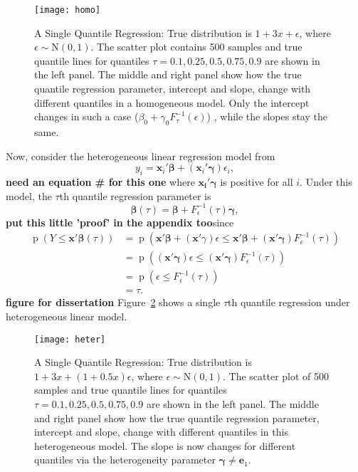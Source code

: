 \documentclass[12pt]{article}
\DeclareMathOperator{\pr}{p}
\begin{document}
\begin{figure}[h]
  \centerline{\texttt{[image: homo]}}
  \caption[]{\label{fig:homo} A Single Quantile Regression: True 
    distribution is $1+3x + \epsilon$, where $\epsilon \sim
    \mathrm{N}(0,1)$. The scatter plot contains 500 samples and true quantile
    lines for quantiles $\tau=0.1,0.25,0.5,0.75,0.9$ are shown in the
    left panel. The middle and right panel show how the true quantile
    regression parameter, intercept and slope, change with different
    quantiles in a homogeneous model. Only the intercept changes in such
    a case ($\beta_0+\gamma_0 F^{-1}_{\tau}(\epsilon)$) , while the slopes
    stay the same.}
  \label{fig:homo}
\end{figure}

Now, consider the heterogeneous linear regression model  from \citet{he1998}  
\begin{displaymath}
  y_i = \bm{x}_i'\bm{\beta} + (\bm{x}_i'\bm{\gamma}) \epsilon_i, 
\end{displaymath}
{\bf need an equation \# for this one}
where $\bm{x_i'\gamma}$ is positive  for all
$i$. Under this model, the $\tau$th quantile regression parameter is 
\begin{equation}\label{eq:2}
  \bm{\beta}(\tau) = \bm{\beta} + F^{-1}_{\epsilon}(\tau) \bm{\gamma},
\end{equation}
{\bf put this little 'proof' in the appendix too}since 
\begin{align*}
  \pr (Y \le \bm{x'\beta}(\tau)) & = \pr \left( \bm{x'\beta} +
    (\bm{x}'\gamma) \epsilon \le \bm{x'\beta} + (\bm{x'\gamma})
    F^{-1}_{\epsilon}(\tau) \right) \\
  & = \pr \left( (\bm{x'\gamma}) \epsilon \le  (\bm{x'\gamma})
    F^{-1}_{\epsilon}(\tau)  \right)\\
  & = \pr (\epsilon \le F^{-1}_{\epsilon}(\tau)) \\
  & = \tau .
\end{align*}
{\bf figure for dissertation}
Figure~\ref{fig:hetero} shows a single $\tau$th quantile regression under
heterogeneous linear model.  

\begin{figure}[h]
  \centerline{\texttt{[image: heter]}}
  \caption[]{ \label{fig:heter} A Single Quantile Regression: True
    distribution is $1+3x + (1+0.5x)\epsilon$, where $\epsilon \sim
    \mathrm{N}(0,1)$. The scatter plot of 500 samples and true quantile
    lines for quantiles $\tau=0.1,0.25,0.5,0.75,0.9$ are shown in the
    left panel. The middle and right panel show how the true quantile
    regression parameter, intercept and slope, change with different
    quantiles in this heterogeneous model. The slope is now changes 
    for different quantiles via the heterogeneity parameter $\bm{\gamma}
    \neq \bm{e}_1$.  }
  \label{fig:hetero}
\end{figure}
\end{document}
